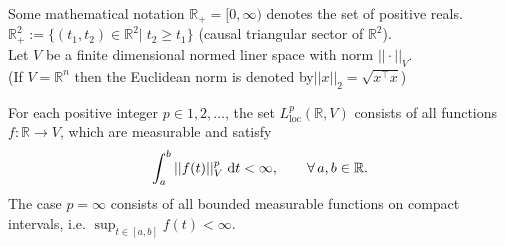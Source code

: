 \documentclass[aspectratio=169]{beamer}
\newcommand{\bbR}{\mathbb{R}}
\begin{document}
\begin{frame}{Some mathematical notation}
$\bbR_+ = [0, \infty)$ denotes the set of positive reals. \\
$\bbR^2_+:=\{(t_1, t_2) \in \bbR^2 |\;  t_2\ge t_1\}$ (causal triangular sector of $\bbR^2$). \\
Let $V$ be a finite dimensional normed liner space with norm $||\cdot||_V$. \\
\vspace{.1cm}
(If $V=\bbR^n$ then the Euclidean norm is denoted by$||x||_2 = \sqrt{x^\top x}$)

\begin{definition}
	For each positive integer $p \in {1, 2, \dots}$, the set $L^p_{\text{loc}}(\bbR, V)$ consists of all functions $f : \bbR \rightarrow V$, which are measurable and satisfy
	\begin{equation*}
		\int_a^b ||f(t)||^p_V \d t< \infty, \qquad \forall\,  a, b \in \bbR.
	\end{equation*}
	The case $p=\infty$ consists of all bounded measurable functions on compact intervals, i.e. $\sup_{t \in [a, b]} f(t) < \infty.$
	
\end{definition}

\end{frame}
\end{document}
